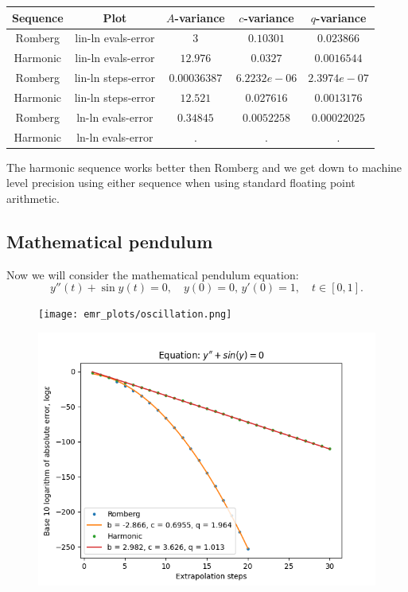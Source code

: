 \begin{table}[H]
    \centering
    \begin{tabular}{c|c||c|c|c}
Sequence & Plot & \(A\)-variance & \(c\)-variance & \(q\)-variance\\\hline
Romberg & lin-ln evals-error & \(3\) & \(0.10301\) & \(0.023866\) \\
Harmonic & lin-ln evals-error & \(12.976\) & \(0.0327\) & \(0.0016544\) \\
Romberg & lin-ln steps-error & \(0.00036387\) & \(6.2232e-06\) & \(2.3974e-07\) \\
Harmonic & lin-ln steps-error & \(12.521\) & \(0.027616\) & \(0.0013176\) \\
Romberg & ln-ln evals-error & \(0.34845\) & \(0.0052258\) & \(0.00022025\) \\
Harmonic & ln-ln evals-error & . & . & . \\
    \end{tabular}
    \label{tab:my_label}
\end{table}

The harmonic sequence works better then Romberg and we get down to machine level precision using either sequence when using standard floating point arithmetic.

\subsection{Mathematical pendulum}

Now we will consider the mathematical pendulum equation:
\begin{equation}
y''(t) + \sin y(t) = 0,\quad y(0) = 0,\, y'(0) = 1, \quad t\in [0,1].
\end{equation}

\begin{figure}[H]
\centering
\begin{minipage}{0.45\textwidth}
\centering
\texttt{[image: emr\_plots/oscillation.png]}
\end{minipage}
\begin{minipage}{0.45\textwidth}
\centering
\includegraphics[scale=0.45]{emr_plots/oscillation_hp_steps.png}
\end{minipage}
\end{figure}

